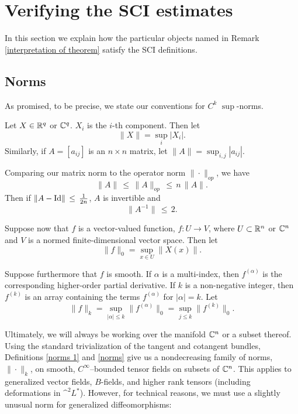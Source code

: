 \documentclass{article}
\begin{document}
\section{Verifying the SCI estimates}\label{verifying SCI}

In this section we explain how the particular objects named in Remark \ref{interpretation of theorem} satisfy the SCI definitions.

\subsection{Norms}\label{norm section}

As promised, to be precise, we state our conventions for $C^k$ $\sup$-norms.

\begin{defn}\label{norms 1}
Let $X \in \mathbb R^q$ or $\mathbb C^q$.  $X_i$ is the $i$-th component.  Then let
$$\|X\| = \sup_i |X_i|.$$
Similarly, if $A=[a_{ij}]$ is an $n\times n$ matrix, let $\|A\| = \sup_{i,j} |a_{ij}|$.
\end{defn}
\begin{rem}\label{matrix inverse estimate}
Comparing our matrix norm to the operator norm ${\|\cdot\|_{op}}$, we have
$$\|A\| \,\leq\, \|A\|_{op} \,\leq\, n\,\|A\|.$$
Then if $\|A-\textrm{Id}\| \,\leq\, \frac{1}{2n}$, $A$ is invertible and
$$\|A^{-1}\| \,\leq\, 2.$$
\end{rem}

\begin{defn}\label{norms}
Suppose now that $f$ is a vector-valued function, $f : U \to V$, where $U \subset \mathbb R^n$ or $\mathbb C^n$ and $V$ is a normed finite-dimensional vector space.  Then let
$$\|f\|_0 = \sup_{x\in U} \|X(x)\|.$$

Suppose furthermore that $f$ is smooth.  If $\alpha$ is a multi-index, then $f^{(\alpha)}$ is the corresponding higher-order partial derivative.  If $k$ is a non-negative integer, then $f^{(k)}$ is an array containing the terms $f^{(\alpha)}$ for $|\alpha|=k$.  Let
\begin{equation*}
\|f\|_k = \sup_{|\alpha| \leq k} \|f^{(\alpha)}\|_0 = \sup_{j \leq k} \|f^{(k)}\|_0.
\end{equation*}
\end{defn}

\begin{rem}
Ultimately, we will always be working over the manifold $\mathbb C^n$ or a subset thereof.  Using the standard trivialization of the tangent and cotangent bundles, Definitions \ref{norms 1} and \ref{norms} give us a nondecreasing family of norms, $\|\cdot\|_k$, on smooth, $C^\infty$--bounded tensor fields on subsets of $\mathbb C^n$.  This applies to generalized vector fields, $B$-fields, and higher rank tensors (including deformations in $\^ ^2 L^*$).  However, for technical reasons, we must use a slightly unusual norm for generalized diffeomorphisms:
\end{rem}
\end{document}
